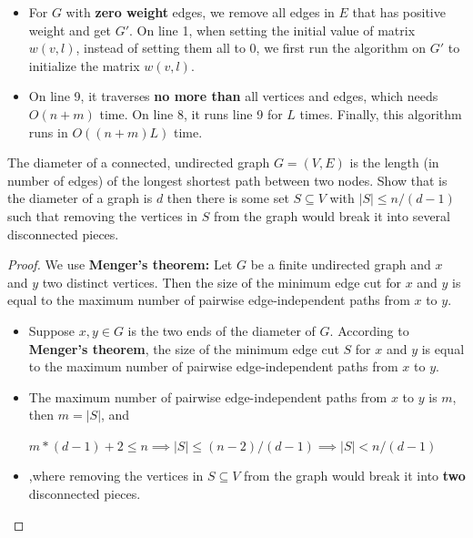 \documentclass{article}
\newcounter{exercise}
\newcommand{\<}{
    \langle}
\renewcommand{\>}{
    \rangle}
\begin{document}
{\begin{itemize}
    \item For $G$ with \textbf{zero weight} edges, we remove all edges in $E$ that has positive weight and get $G'$. On line 1, when setting the initial value of matrix $w(v,l)$, instead of setting them all to $0$, we first run the algorithm on $G'$ to initialize the matrix $w(v,l)$.
    \item On line 9, it traverses \textbf{no more than} all vertices and edges, which needs $O(n+m)$ time. On line 8, it runs line 9 for $L$ times. Finally, this algorithm runs in $O((n+m)L)$ time.
\end{itemize}

\newpage

\begin{exercise}
The diameter of a connected, undirected graph $G=(V,E)$ is the length (in number of edges) of the longest shortest path between two nodes. Show that is the diameter of a graph is $d$ then there is some set $S\subseteq V$ with $|S|\leq n/(d-1)$ such that removing the vertices in $S$ from the graph would break it into several disconnected pieces.

\end{exercise}
\begin{proof} 
    \leavevmode\newline

We use \textbf{Menger's theorem:} Let $G$ be a finite undirected graph and $x$ and $y$ two distinct vertices. Then the size of the minimum edge cut for $x$ and $y$ is equal to the maximum number of pairwise edge-independent paths from $x$ to $y$.
\begin{itemize}
    \item Suppose $x,y\in G$ is the two ends of the diameter of $G$. According to \textbf{Menger's theorem}, the size of the minimum edge cut $S$ for $x$ and $y$ is equal to the maximum number of pairwise edge-independent paths from $x$ to $y$.
    \item The maximum number of pairwise edge-independent paths from $x$ to $y$ is $m$, then $m=|S|$, and 
    \begin{center}
        $m*(d-1)+2\leq n\implies |S|\leq (n-2)/(d-1) \implies |S| < n/(d-1)$ 
    \end{center}
    \item ,where removing the vertices in $S\subseteq V$ from the graph would break it into \textbf{two} disconnected pieces.
\end{itemize}


\end{proof}}
\end{document}
